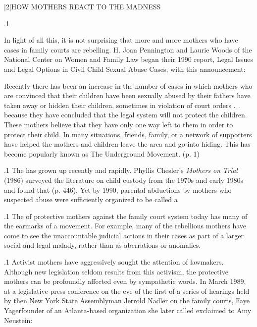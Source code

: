 \documentclass[11pt, twoside]{article}
\begin{document}
{\s|2|{HOW MOTHERS REACT TO THE MADNESS}

\p.1{%
\noindent{}\:In light of all this, it is not surprising that more and more mothers who
have cases in family courts are rebelling. H. Joan Pennington and Laurie
Woods of the National Center on Women and Family Law began their
1990 report, Legal Issues and Legal Options in Civil Child Sexual Abuse
Cases, with this announcement:

\begin{blockQuote}
Recently there has been an increase in the number of cases in which
mothers who are convinced that their children have been sexually
abused by their fathers have taken away or hidden their children,
sometimes in violation of court orders .~. because they have concluded that the legal system will not protect the children. These
mothers believe that they have only one way left to them in order
to protect their child. In many situations, friends, family, or a network of supporters have helped the mothers and children leave the
area and go into hiding. This has become popularly known as The
Underground Movement. (p. 1)
\end{blockQuote}
\;
}%

\p.1{%
\:The  has grown up recently and rapidly.
Phyllis Chesler’s \textit{Mothers on Trial} (1986) surveyed the literature on child
custody from the 1970s and early 1980s and found that  (p. 446). Yet by 1990, parental
abductions by mothers who suspected abuse were sufficiently organized
to be called a \;
}%

\p.1{%
\:The  of protective mothers against the family court system
today has many of the earmarks of a movement. For example, many of
the rebellious mothers have come to see the unaccountable judicial actions in their cases as part of a larger social and legal malady, rather than
as aberrations or anomalies.\;
}%

\p.1{%
\:Activist mothers have aggressively sought the attention of lawmakers. Although new legislation seldom results from this activism, the
protective mothers can be profoundly affected even by sympathetic
words. In March 1989, at a legislative press conference on the eve of the
first of a series of hearings held by then New York State Assemblyman
Jerrold Nadler on the family courts, Faye Yager\mdash{}founder of an
Atlanta-based organization she later called \mdash{}exclaimed to Amy Neustein: \;
}%

}
\end{document}
